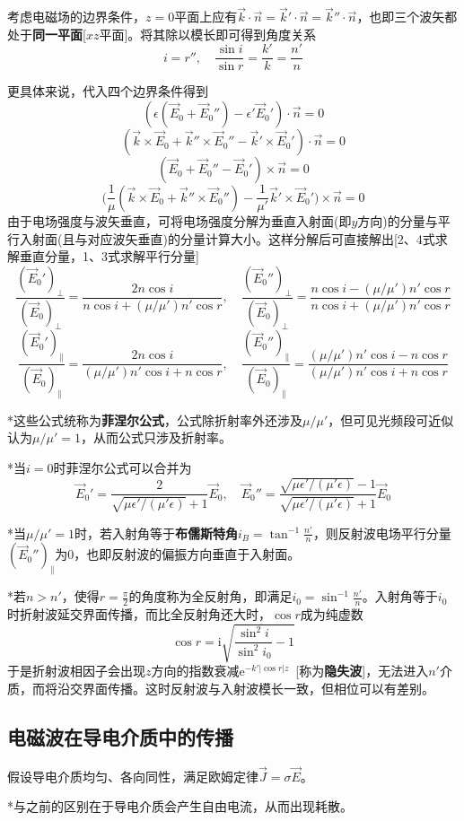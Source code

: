 \documentclass[a4paper,UTF8,fontset=windows]{ctexart}
\newcommand*{\er}{\mathrm{e}}
\newcommand*{\ir}{\mathrm{i}}
\newcommand*{\ve}{\vec{E}}
\newcommand*{\vj}{\vec{J}}
\newcommand*{\vks}{\vec{k}}
\newcommand*{\vns}{\vec{n}}
\begin{document}
考虑电磁场的边界条件，$z=0$平面上应有$\vks\cdot\vns=\vks'\cdot\vns=\vks''\cdot\vns$，也即三个波矢都处于\textbf{同一平面}[$xz$平面]。将其除以模长即可得到角度关系
$$i=r'',\quad\frac{\sin i}{\sin r}=\frac{k'}{k}=\frac{n'}{n}$$

更具体来说，代入四个边界条件得到
$$(\epsilon(\ve_0+\ve_0'')-\epsilon'\ve_0')\cdot\vns=0$$
$$(\vks\times\ve_0+\vks''\times\ve_0''-\vks'\times\ve_0')\cdot\vns=0$$
$$(\ve_0+\ve_0''-\ve_0')\times\vns=0$$
$$\bigg(\frac{1}{\mu}(\vks\times\ve_0+\vks''\times\ve_0'')-\frac{1}{\mu'}\vks'\times\ve_0'\bigg)\times\vns=0$$
由于电场强度与波矢垂直，可将电场强度分解为垂直入射面(即$y$方向)的分量与平行入射面(且与对应波矢垂直)的分量计算大小。这样分解后可直接解出[2、4式求解垂直分量，1、3式求解平行分量]
$$\frac{(\ve_0')_\bot}{(\ve_0)_\bot}=\frac{2n\cos i}{n\cos i+(\mu/\mu')n'\cos r},\quad\frac{(\ve_0'')_\bot}{(\ve_0)_\bot}=\frac{n\cos i-(\mu/\mu')n'\cos r}{n\cos i+(\mu/\mu')n'\cos r}$$
$$\frac{(\ve_0')_\parallel}{(\ve_0)_\parallel}=\frac{2n\cos i}{(\mu/\mu')n'\cos i+n\cos r},\quad\frac{(\ve_0'')_\parallel}{(\ve_0)_\parallel}=\frac{(\mu/\mu')n'\cos i-n\cos r}{(\mu/\mu')n'\cos i+n\cos r}$$

*这些公式统称为\textbf{菲涅尔公式}，公式除折射率外还涉及$\mu/\mu'$，但可见光频段可近似认为$\mu/\mu'=1$，从而公式只涉及折射率。

*当$i=0$时菲涅尔公式可以合并为
$$\ve_0'=\frac{2}{\sqrt{\mu\epsilon'/(\mu'\epsilon)}+1}\ve_0,\quad\ve_0''=\frac{\sqrt{\mu\epsilon'/(\mu'\epsilon)}-1}{\sqrt{\mu\epsilon'/(\mu'\epsilon)}+1}\ve_0$$

*当$\mu/\mu'=1$时，若入射角等于\textbf{布儒斯特角}$i_B=\tan^{-1}\frac{n'}{n}$，则反射波电场平行分量$(\ve_0'')_\parallel$为0，也即反射波的偏振方向垂直于入射面。

*若$n>n'$，使得$r=\frac{\pi}{2}$的角度称为全反射角，即满足$i_0=\sin^{-1}\frac{n'}{n}$。入射角等于$i_0$时折射波延交界面传播，而比全反射角还大时，$\cos r$成为纯虚数
$$\cos r=\ir\sqrt{\frac{\sin^2i}{\sin^2i_0}-1}$$
于是折射波相因子会出现$z$方向的指数衰减$\er^{-k'|\cos r|z}$\ [称为\textbf{隐失波}]，无法进入$n'$介质，而将沿交界面传播。这时反射波与入射波模长一致，但相位可以有差别。

\subsection{电磁波在导电介质中的传播}
假设导电介质均匀、各向同性，满足欧姆定律$\vj=\sigma\ve$。

*与之前的区别在于导电介质会产生自由电流，从而出现耗散。
\end{document}
